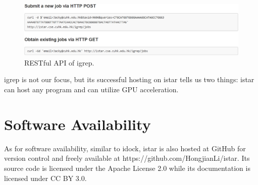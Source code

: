 \begin{figure}
\centering
\includegraphics[width=\linewidth]{istar/igrep-rest.png}
\caption{RESTful API of igrep.}
\label{istar:igrep-rest}
\end{figure}

igrep is not our focus, but its successful hosting on istar tells us two things: istar can host any program and can utilize GPU acceleration.

\section{Software Availability}

As for software availability, similar to idock, istar is also hosted at GitHub for version control and freely available at https://github.com/HongjianLi/istar. Its source code is licensed under the Apache License 2.0 while its documentation is licensed under CC BY 3.0.

\chapterend
